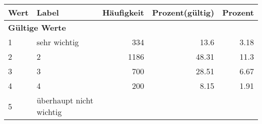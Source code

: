      \begin{longtable}{lXrrr}
     \toprule
     \textbf{Wert} & \textbf{Label} & \textbf{Häufigkeit} & \textbf{Prozent(gültig)} & \textbf{Prozent} \\
     \endhead
     \midrule
     \multicolumn{5}{l}{\textbf{Gültige Werte}}\\

     1 &
     \multicolumn{1}{X}{ sehr wichtig   } &


       \num{334} &
       \num[round-mode=places,round-precision=2]{13.6} &
         \num[round-mode=places,round-precision=2]{3.18} \\

     2 &
     \multicolumn{1}{X}{ 2   } &


       \num{1186} &
       \num[round-mode=places,round-precision=2]{48.31} &
         \num[round-mode=places,round-precision=2]{11.3} \\

     3 &
     \multicolumn{1}{X}{ 3   } &


       \num{700} &
       \num[round-mode=places,round-precision=2]{28.51} &
         \num[round-mode=places,round-precision=2]{6.67} \\

     4 &
     \multicolumn{1}{X}{ 4   } &


       \num{200} &
       \num[round-mode=places,round-precision=2]{8.15} &
         \num[round-mode=places,round-precision=2]{1.91} \\

     5 &
     \multicolumn{1}{X}{ überhaupt nicht wichtig   } &



\end{longtable}
